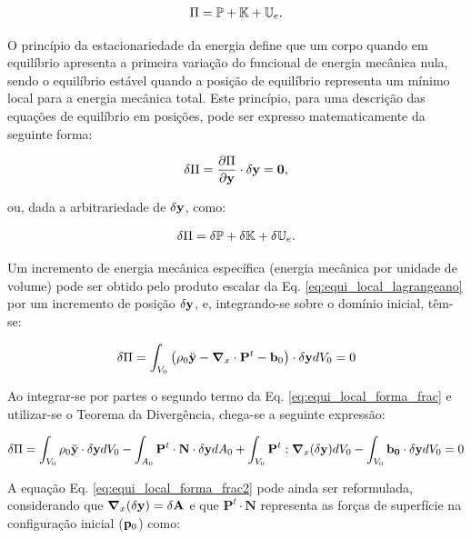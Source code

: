 \documentclass[tese_patricia]{subfiles}
\begin{document}
\begin{align}
	\Pi = \mathbb{P} + \mathbb{K} + \mathbb{U}_e.
\end{align}

O princípio da estacionariedade da energia define que um corpo quando em equilíbrio apresenta a primeira variação do funcional de energia mecânica nula, sendo o equilíbrio estável quando a posição de equilíbrio representa um mínimo local para a energia mecânica total. Este princípio, para uma descrição das equações de equilíbrio em posições, pode ser expresso matematicamente da seguinte forma:

\begin{align}
	\delta\Pi = \frac{\partial{\Pi}}{\partial{\mathbf{y}}} \cdot \delta\mathbf{y} = \mathbf{0}, \label{eq:princ_esta}
\end{align}

\noindent ou, dada a arbitrariedade de $\delta\mathbf{y}$, como: 

\begin{align}
	\delta\Pi = \delta\mathbb{P} + \delta\mathbb{K} + \delta\mathbb{U}_e.
\end{align}

Um incremento de energia mecânica específica (energia mecânica por unidade de volume) pode ser obtido pelo produto escalar da Eq. \ref{eq:equi_local_lagrangeano} por um incremento de posição $\delta\mathbf{y}$, e, integrando-se sobre o domínio inicial, têm-se:

\begin{align}
	\delta\Pi = \int_{V_0} \left(\rho_0 \ddot{\mathbf{y}} - \boldsymbol{\nabla}_x \cdot \mathbf{P}^t -  \mathbf{b}_0 \right) \cdot  \delta\mathbf{y} dV_0 = 0 \label{eq:equi_local_forma_frac}
\end{align}

Ao integrar-se por partes o segundo termo da Eq. \ref{eq:equi_local_forma_frac} e utilizar-se o Teorema da Divergência, chega-se a seguinte expressão:

\begin{align}
	\delta\Pi = \int_{V_0} \rho_0 \ddot{\mathbf{y}} \cdot \delta\mathbf{y} dV_0 - \int_{A_0} \mathbf{P}^t \cdot \mathbf{N} \cdot  \delta\mathbf{y} dA_0  + \int_{V_0} \mathbf{P}^t : \boldsymbol{\nabla}_x(\delta\mathbf{y}) dV_0 - \int_{V_0} \mathbf{b_0} \cdot \delta \mathbf{y} dV_0 = 0 \label{eq:equi_local_forma_frac2}
\end{align}

A equação Eq. \ref {eq:equi_local_forma_frac2} pode ainda ser reformulada, considerando que $\boldsymbol{\nabla}_x (\delta\mathbf{y}) = \delta \mathbf{A}$ e que $\mathbf{P}^t \cdot \mathbf{N}$ representa as forças de superfície na configuração inicial ($\mathbf{p}_{0}$) como:
\end{document}
